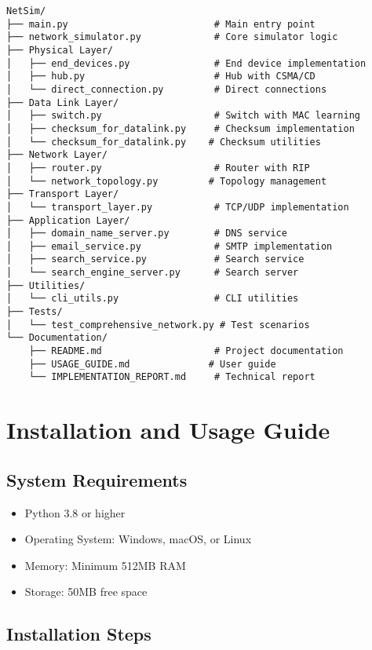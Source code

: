 \documentclass[12pt,a4paper]{article}
\begin{document}
\begin{lstlisting}[caption=Project File Structure]
NetSim/
├── main.py                          # Main entry point
├── network_simulator.py             # Core simulator logic
├── Physical Layer/
│   ├── end_devices.py               # End device implementation
│   ├── hub.py                       # Hub with CSMA/CD
│   └── direct_connection.py         # Direct connections
├── Data Link Layer/
│   ├── switch.py                    # Switch with MAC learning
│   ├── checksum_for_datalink.py     # Checksum implementation
│   └── checksum_for_datalink.py    # Checksum utilities
├── Network Layer/
│   ├── router.py                    # Router with RIP
│   └── network_topology.py         # Topology management
├── Transport Layer/
│   └── transport_layer.py           # TCP/UDP implementation
├── Application Layer/
│   ├── domain_name_server.py        # DNS service
│   ├── email_service.py             # SMTP implementation
│   ├── search_service.py            # Search service
│   └── search_engine_server.py      # Search server
├── Utilities/
│   └── cli_utils.py                 # CLI utilities
├── Tests/
│   └── test_comprehensive_network.py # Test scenarios
└── Documentation/
    ├── README.md                    # Project documentation
    ├── USAGE_GUIDE.md              # User guide
    └── IMPLEMENTATION_REPORT.md     # Technical report
\end{lstlisting}

\section{Installation and Usage Guide}

\subsection{System Requirements}

\begin{itemize}
\item Python 3.8 or higher
\item Operating System: Windows, macOS, or Linux
\item Memory: Minimum 512MB RAM
\item Storage: 50MB free space
\end{itemize}

\subsection{Installation Steps}
\end{document}
